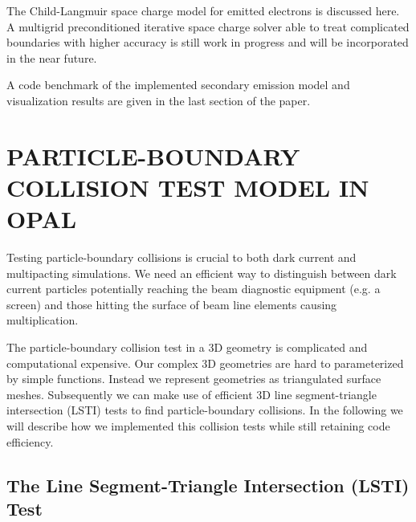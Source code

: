 \documentclass{JAC2003}
\begin{document}
The Child-Langmuir space charge model for emitted electrons is discussed here. A
multigrid preconditioned iterative space charge solver able to treat
complicated boundaries with higher accuracy is still work in progress and will
be incorporated in the near future.

A code benchmark of the implemented secondary emission model and visualization
results are given in the last section of the paper.

\section{PARTICLE-BOUNDARY COLLISION TEST MODEL IN OPAL}

Testing particle-boundary collisions is crucial to both dark current and
multipacting simulations. We need an efficient way to distinguish between dark
current particles potentially reaching the beam diagnostic equipment (e.g. a
screen) and those hitting the surface of beam line elements causing
multiplication.

The particle-boundary collision test in a 3D geometry is complicated and
computational expensive. Our complex 3D geometries are hard to parameterized
by simple functions. Instead we represent geometries as triangulated surface
meshes. Subsequently we can make use of efficient 3D line segment-triangle
intersection (LSTI) tests to find particle-boundary collisions. In the following
we will describe how we implemented this collision tests while still retaining
code efficiency.

\subsection{The Line Segment-Triangle Intersection (LSTI) Test}
\end{document}
